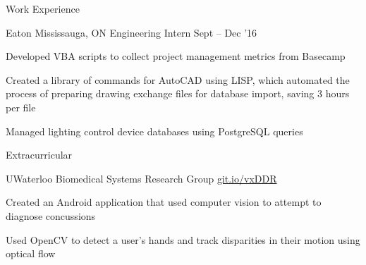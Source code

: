 \documentclass{resume} %
\begin{document}
\begin{rSection}{Work Experience}
		\begin{rSubsection}{Eaton}
			{Mississauga, ON}
			{Engineering Intern}
			{Sept -- Dec '16}
			
			\item Developed VBA scripts to collect project management metrics from Basecamp
			\item Created a library of commands for AutoCAD using LISP, which automated the process of preparing drawing exchange files for database import, saving 3 hours per file
			\item Managed lighting control device databases using PostgreSQL queries
		\end{rSubsection}
		
	\end{rSection}

	
	\begin{rSection}{Extracurricular}
	
%

		\begin{rSubsection}{UWaterloo Biomedical Systems Research Group}			
            {\href{https://git.io/vxDDR}{git.io/vxDDR}}
			{}{}

            \item Created an Android application that used computer vision to attempt to diagnose concussions
            \item Used OpenCV to detect a user's hands and track disparities in their motion using optical flow
		\end{rSubsection}	
	\end{rSection}

	
\end{document}
